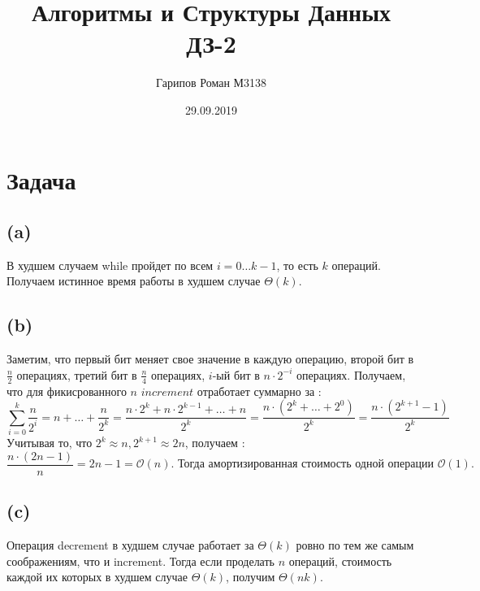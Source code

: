 \documentclass{article}
\title{Алгоритмы и Структуры Данных ДЗ-2}
\date{29.09.2019}
\author{Гарипов Роман М3138}
\begin{document}
  \maketitle
  \newpage
		
\section*{Задача }
\subsection*{(a)}
В худшем случаем while пройдет по всем $i = 0 \dots k - 1$, то есть $k$ операций. Получаем истинное время работы в худшем случае $\Theta(k)$.
\subsection*{(b)}
Заметим, что первый бит меняет свое значение в каждую операцию, второй бит в $\frac{n}{2}$ операциях, третий бит в $\frac{n}{4}$ операциях, $i$-ый бит в $n \cdot 2^{-i}$ операциях.
\newline
Получаем, что для фикисрованного $n$ $increment$ отработает суммарно за :
$$\sum_{i = 0}^{k}\frac{n}{2^{i}} = n + \dots + \frac{n}{2^{k}} = \frac{n \cdot 2^{k} + n \cdot 2^{k - 1} + \dots + n}{2^{k}} = \frac{n\cdot(2^{k} + \dots + 2^{0})}{2^{k}} = \frac{n \cdot (2^{k + 1} - 1)}{2^{k}}$$
 Учитывая то, что $2^{k} \approx n, 2^{k + 1} \approx 2n$, получаем :
 $$\frac{n \cdot (2n - 1)}{n} = 2n - 1 = \mathcal{O}(n)\mbox{. Тогда амортизированная стоимость одной операции } \mathcal{O}(1).$$
\subsection*{(c)}
Операция decrement в худшем случае работает за $\Theta(k)$ ровно по тем же самым соображениям, что и increment.
\newline
Тогда если проделать $n$ операций, стоимость каждой их которых в худшем случае $\Theta(k)$, получим $\Theta(nk)$.
\end{document}
